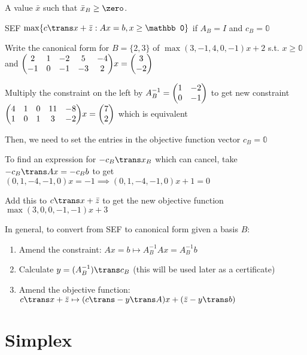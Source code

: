 \begin{defn}
  A value $\bar x$ such that $\bar x_B \geq \zero$.
\end{defn}

\begin{defn}
  SEF $\max\{c\trans x+\bar z:Ax=b,x\geq\mathbb0\}$ if $A_B=I$ and
  $c_B=\mathbb 0$
\end{defn}


\begin{example}
  Write the canonical form for $B=\{2,3\}$ of
  $\max (3,-1,4,0,-1)x + 2$ s.t. $x \geq \mathbb 0$ and
  $\mqty(2&1&-2&5&-4\\-1&0&-1&-3&2)x = \mqty(3\\-2)$
\end{example}

\begin{sol}
  Multiply the constraint on the left by
  $A_B^{-1} = \mqty(1&-2\\0&-1)$ to get new constraint
  $\mqty(4&1&0&11&-8\\1&0&1&3&-2)x=\mqty(7\\2)$ which is equivalent

  Then, we need to set the entries in the objective function vector
  $c_B = \mathbb 0$

  To find an expression for $-c_B\trans x_B$ which can cancel, take
  $-c_B\trans Ax = -c_B b$ to get
  $(0,1,-4,-1,0)x = -1 \implies (0,1,-4,-1,0)x + 1 = 0$

  Add this to $c\trans x + \bar z$ to get the new objective function
  $\max (3,0,0,-1,-1)x + 3$
\end{sol}

In general, to convert from SEF to canonical form given a basis $B$:

\begin{enumerate}[1.,nosep]
  \item Amend the constraint: $Ax = b \mapsto A_B^{-1} A x = A_B^{-1} b$
  \item Calculate $y = (A_B^{-1})\trans c_B$
        (this will be used later as a certificate)
  \item Amend the objective function:
        $c\trans x + \bar z \mapsto (c\trans - y\trans A)x + (\bar z - y\trans b)$
\end{enumerate}

\section{Simplex}

